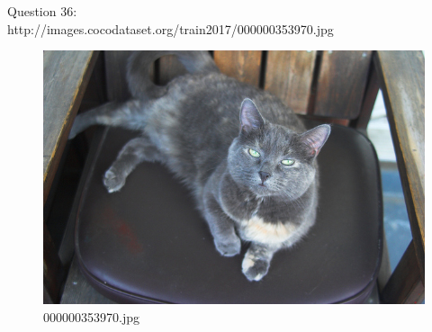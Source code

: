     Question 36:\\http://images.cocodataset.org/train2017/000000353970.jpg
    \begin{figure}[h]
        \centering
        \includegraphics[width=0.8\linewidth]{../image set/easy/000000353970.jpg}
        \caption{000000353970.jpg}
    \end{figure}
